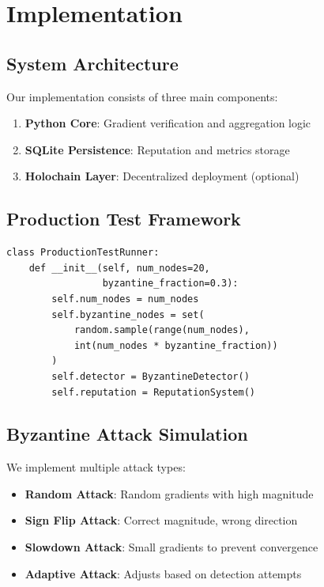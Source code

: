 \documentclass[conference]{IEEEtran}
\begin{document}
\section{Implementation}

\subsection{System Architecture}

Our implementation consists of three main components:

\begin{enumerate}
\item \textbf{Python Core}: Gradient verification and aggregation logic
\item \textbf{SQLite Persistence}: Reputation and metrics storage
\item \textbf{Holochain Layer}: Decentralized deployment (optional)
\end{enumerate}

\subsection{Production Test Framework}

\begin{verbatim}
class ProductionTestRunner:
    def __init__(self, num_nodes=20, 
                 byzantine_fraction=0.3):
        self.num_nodes = num_nodes
        self.byzantine_nodes = set(
            random.sample(range(num_nodes), 
            int(num_nodes * byzantine_fraction))
        )
        self.detector = ByzantineDetector()
        self.reputation = ReputationSystem()
\end{verbatim}

\subsection{Byzantine Attack Simulation}

We implement multiple attack types:
\begin{itemize}
\item \textbf{Random Attack}: Random gradients with high magnitude
\item \textbf{Sign Flip Attack}: Correct magnitude, wrong direction
\item \textbf{Slowdown Attack}: Small gradients to prevent convergence
\item \textbf{Adaptive Attack}: Adjusts based on detection attempts
\end{itemize}
\end{document}
